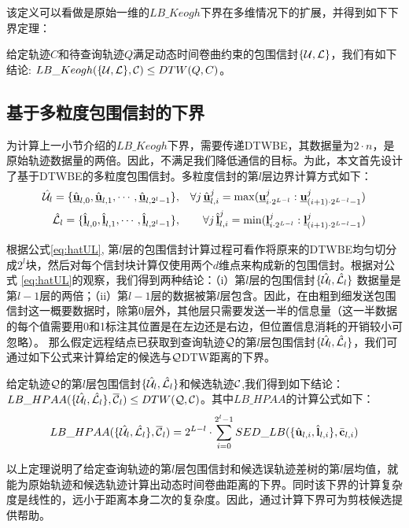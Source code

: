 该定义可以看做是原始一维的$LB\_Keogh$下界在多维情况下的扩展，并得到如下下界定理：
\begin{theorem}\label{theorem:DTWLBK}
	给定轨迹$C$和待查询轨迹$Q$满足动态时间卷曲约束的包围信封$\{{\cal U}, {\cal L}\}$，我们有如下结论: $LB\_Keogh({\{\cal U,\cal L\},{\cal C}}) \le DTW(Q,C)$。
\end{theorem}


\subsection{基于多粒度包围信封的下界} 
为计算上一小节介绍的$LB\_Keogh$下界，需要传递DTWBE，其数据量为$2\cdot n$，是原始轨迹数据量的两倍。因此，不满足我们降低通信的目标。为此，本文首先设计了基于DTWBE的多粒度包围信封。多粒度信封的第$l$层边界计算方式如下：
\begin{eqnarray}\label{eq:hatUL}
\hat{{\cal U}}_l =\{ \hat{\emph{{\textbf{u}}}}_{l,0}, \hat{\emph{{\textbf{u}}}}_{l,1},\cdots, \hat{\emph{{\textbf{u}}}}_{l,2^l-1}\}  &,&
\forall j  \, \hat{\emph{{\textbf{u}}}}_{l,i}^{j}=\max(\emph{{\textbf{u}}}_{i\cdot 2^{L-l}}^{j} : \emph{{\textbf{u}}}_{(i+1)\cdot 2^{L-l}-1}^{j})  \nonumber \\
\hat{{\cal L}}_l=\{\hat{\emph{{\textbf{l}}}}_{l,0}, \hat{\emph{{\textbf{l}}}}_{l,1},\cdots, \hat{\emph{{\textbf{l}}}}_{l,2^l-1}\}   &,&
\forall j  \, \hat{\emph{{\textbf{l}}}}_{l,i}^{j}=\min(\emph{{\textbf{l}}}_{i\cdot 2^{L-l}}^{j} : \emph{{\textbf{l}}}_{(i+1)\cdot 2^{L-l}-1}^{j})
\end{eqnarray}	

根据公式\ref{eq:hatUL}, 第$l$层的包围信封计算过程可看作将原来的DTWBE均匀切分成$2^l$块，然后对每个信封块计算仅使用两个$d$维点来构成新的包围信封。根据对公式 \ref{eq:hatUL}的观察，我们得到两种结论：（i）第$l$层的包围信封$\{\hat{{\cal U}}_{l}, \hat{{\cal L}}_{l}\}$ 数据量是第$l-1$层的两倍；（ii）第$l-1$层的数据被第$l$层包含。因此，在由粗到细发送包围信封这一概要数据时，除第$0$层外，其他层只需要发送一半的信息量（这一半数据的每个值需要用0和1标注其位置是在左边还是右边，但位置信息消耗的开销较小可忽略）。
那么假定远程结点已获取到查询轨迹$\cal Q$的第$l$层包围信封$\{\hat{{\cal U}}_l,\hat{{\cal L}}_l\}$，我们可通过如下公式来计算给定的候选与$\cal Q$DTW距离的下界。
\begin{theorem}\label{theo:HPAA}
	给定轨迹$\cal Q$的第$l$层包围信封$\{\hat{{\cal U}}_{l}, \hat{{\cal L}}_{l}\}$和候选轨迹$\cal C$,我们得到如下结论：
	 $LB\_HPAA({  \{\hat{{\cal U}_{l}}, \hat{{\cal L}_{l}}\},\overline{{\cal C}}_{l}}) \le DTW(\cal Q, \cal C)$。其中$LB\_HPAA$的计算公式如下：
	 \begin{eqnarray}\label{bound:HPAA}
	 LB\_HPAA({\{\hat{{\cal U}_{l}}, \hat{{\cal L}_{l}}\},\overline{{\cal C}}_{l}})= 2^{L-l} \cdot \sum_{i=0}^{2^{l}-1} SED\_LB(\{ \hat{\textbf{u}}_{l,i}, \hat{\textbf{l}}_{l,i} \}, \bar{\textbf{c}}_{l,i})\nonumber
	 \end{eqnarray}
\end{theorem}
以上定理说明了给定查询轨迹的第$l$层包围信封和候选误轨迹差树的第$l$层均值，就能为原始轨迹和候选轨迹计算出动态时间卷曲距离的下界。同时该下界的计算复杂度是线性的，远小于距离本身二次的复杂度。因此，通过计算下界可为剪枝候选提供帮助。

